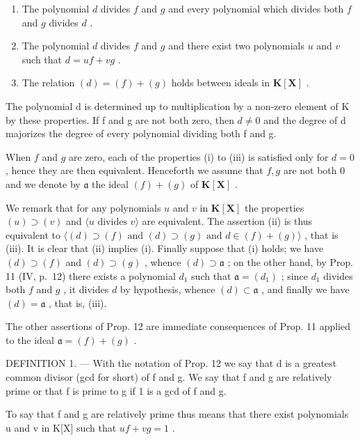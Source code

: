 \begin{enumerate}
\def\labelenumi{(\roman{enumi})}
\item
  The polynomial \(d\) divides \(f\) and \(g\) and every polynomial which divides both \(f\) and \(g\) divides \(d\) .
\item
  The polynomial \(d\) divides \(f\) and \(g\) and there exist two polynomials \(u\) and \(v\) such that \(d = uf + vg\) .
\item
  The relation \((d) = (f) + (g)\) holds between ideals in \(\mathbf{K}[\mathbf{X}]\) .
\end{enumerate}

The polynomial d is determined up to multiplication by a non-zero element of K by these properties. If f and g are not both zero, then \(d \neq 0\) and the degree of d majorizes the degree of every polynomial dividing both f and g.

When \(f\) and \(g\) are zero, each of the properties (i) to (iii) is satisfied only for \(d = 0\) , hence they are then equivalent. Henceforth we assume that \(f, g\) are not both 0 and we denote by \(\mathfrak{a}\) the ideal \((f) + (g)\) of \(\mathbf{K}[\mathbf{X}]\) .

We remark that for any polynomials \(u\) and \(v\) in \(\mathbf{K}[\mathbf{X}]\) the properties \((u) \supset (v)\) and \(\langle u \text{ divides } v \rangle\) are equivalent. The assertion (ii) is thus equivalent to \(\langle (d) \supset (f) \text{ and } (d) \supset (g) \text{ and } d \in (f) + (g) \rangle\) , that is (iii). It is clear that (ii) implies (i). Finally suppose that (i) holds; we have \((d) \supset (f)\) and \((d) \supset (g)\) , whence \((d) \supset \mathfrak{a}\) ; on the other hand, by Prop. 11 (IV, p.~12) there exists a polynomial \(d_1\) such that \(\mathfrak{a} = (d_1)\) ; since \(d_1\) divides both \(f\) and \(g\) , it divides \(d\) by hypothesis, whence \((d) \subset \mathfrak{a}\) , and finally we have \((d) = \mathfrak{a}\) , that is, (iii).

The other assertions of Prop. 12 are immediate consequences of Prop. 11 applied to the ideal \(\mathfrak{a} = (f) + (g)\) .

DEFINITION 1. --- With the notation of Prop. 12 we say that d is a greatest common divisor (gcd for short) of f and g. We say that f and g are relatively prime or that f is prime to g if 1 is a gcd of f and g.

To say that f and g are relatively prime thus means that there exist polynomials u and v in K{[}X{]} such that \(uf + vg = 1\) .

